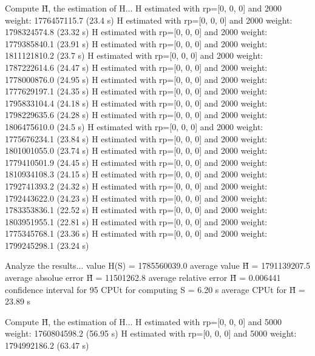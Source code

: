 Compute H̃, the estimation of H...
  H estimated with rp=[0, 0, 0] and 2000 weight:  1776457115.7  (23.4 s)
  H estimated with rp=[0, 0, 0] and 2000 weight:  1798324574.8  (23.32 s)
  H estimated with rp=[0, 0, 0] and 2000 weight:  1779385840.1  (23.91 s)
  H estimated with rp=[0, 0, 0] and 2000 weight:  1811121810.2  (23.7 s)
  H estimated with rp=[0, 0, 0] and 2000 weight:  1787222614.6  (24.47 s)
  H estimated with rp=[0, 0, 0] and 2000 weight:  1778000876.0  (24.95 s)
  H estimated with rp=[0, 0, 0] and 2000 weight:  1777629197.1  (24.35 s)
  H estimated with rp=[0, 0, 0] and 2000 weight:  1795833104.4  (24.18 s)
  H estimated with rp=[0, 0, 0] and 2000 weight:  1798229635.6  (24.28 s)
  H estimated with rp=[0, 0, 0] and 2000 weight:  1806475610.0  (24.5 s)
  H estimated with rp=[0, 0, 0] and 2000 weight:  1775676234.1  (23.84 s)
  H estimated with rp=[0, 0, 0] and 2000 weight:  1801001055.0  (23.74 s)
  H estimated with rp=[0, 0, 0] and 2000 weight:  1779410501.9  (24.45 s)
  H estimated with rp=[0, 0, 0] and 2000 weight:  1810934108.3  (24.15 s)
  H estimated with rp=[0, 0, 0] and 2000 weight:  1792741393.2  (24.32 s)
  H estimated with rp=[0, 0, 0] and 2000 weight:  1792443622.0  (24.23 s)
  H estimated with rp=[0, 0, 0] and 2000 weight:  1783353836.1  (22.52 s)
  H estimated with rp=[0, 0, 0] and 2000 weight:  1803951955.1  (22.81 s)
  H estimated with rp=[0, 0, 0] and 2000 weight:  1775345768.1  (23.36 s)
  H estimated with rp=[0, 0, 0] and 2000 weight:  1799245298.1  (23.24 s)

Analyze the results...
  value H(S)                  = 1785560039.0 
  average value H̃             = 1791139207.5 
  average absolue error H̃     = 11501262.8 
  average relative error H̃    = 0.006441 
  confidence interval for 95%
  CPUt for computing S         = 6.20 s
  average CPUt for H̃           = 23.89 s

Compute H̃, the estimation of H...
  H estimated with rp=[0, 0, 0] and 5000 weight:  1760804598.2  (56.95 s)
  H estimated with rp=[0, 0, 0] and 5000 weight:  1794992186.2  (63.47 s)